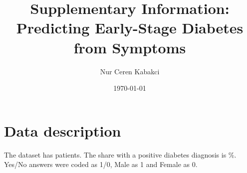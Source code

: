 \documentclass[11pt]{article}
\title{Supplementary Information: Predicting Early-Stage Diabetes from Symptoms}
\author{Nur Ceren Kabakci}
\date{\today}
\begin{document}
\maketitle

\section{Data description}
\label{sec:si-data}
The dataset has \npatients{} patients. The share with a positive diabetes diagnosis is \percentpositive\%. Yes/No answers were coded as 1/0,
Male as 1 and Female as 0.
\end{document}
